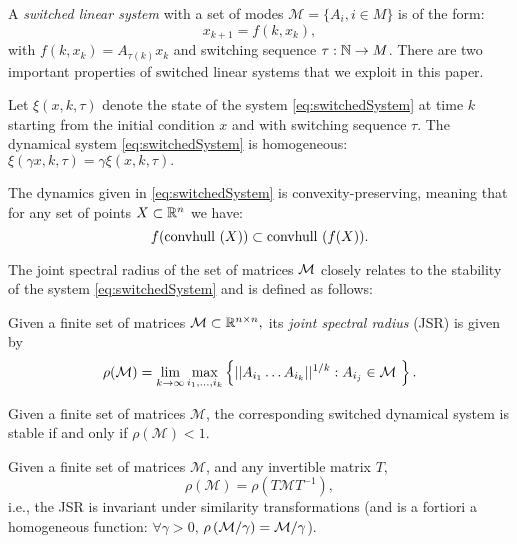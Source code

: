 A \emph{switched linear system} with a set of modes \mbox{$\mathcal{M}= \{A_i, i \in M \}$} is of the form:
\begin{equation}\label{eq:switchedSystem}x_{k+1} = f(k,x_k),\end{equation}
with $f(k,x_k) = A_{\tau(k)}x_k$ and switching sequence \mbox{$\tau: \mathbb{N} \to M$.} There are two important properties of switched linear systems that we exploit in this paper.
\begin{property}\label{property:homogeneity}
Let $\xi(x, k, \tau)$ denote the state of the system \eqref{eq:switchedSystem} at time $k$ starting from the initial condition $x$ and with switching sequence $\tau$. The dynamical system \eqref{eq:switchedSystem} is homogeneous: $\xi(\gamma x, k, \tau)= \gamma \xi(x, k, \tau).$
\end{property}
\begin{property}\label{property:convpres}
The dynamics given in \eqref{eq:switchedSystem} is convexity-preserving, meaning that for any set of points $X \subset \mathbb{R}^n$ we have:
$$ f(\mbox{convhull }({X}))\subset \mbox{convhull }(f(X)). $$
\end{property}

The joint spectral radius of the set of matrices $\mathcal{M}$ closely relates to the stability of the system \eqref{eq:switchedSystem} and is defined as follows:
\begin{definition} \cite{jungers_lncis} Given a finite set of matrices \mbox{$\mathcal{M} \subset \mathbb{R}^{n\times n},$} its \emph{joint spectral radius} (JSR) is given by
$$\rho(\mathcal{M}) =\lim_{k\rightarrow \infty} \max_{i_1,\dots, i_k} \left\{||A_{i_1} \dots A_{i_k}||^{1/k}: A_{i_j}\in\mathcal{M}\ \right\}. $$
\end{definition}

\begin{property}
Given a finite set of matrices $\mathcal{M}$, the corresponding switched dynamical system is stable if and only if $\rho(\mathcal{M})<1$.
\end{property}

\begin{property}\label{rem:scaling}
Given a finite set of matrices $\mathcal{M}$, and any invertible matrix $T$, 
$$\rho(\mathcal{M})=\rho(T \mathcal{M} T^{-1}),$$
i.e., the JSR is invariant under similarity transformations (and is a fortiori a homogeneous function: $\forall \gamma > 0,\,$\linebreak$\rho\left(\mathcal{M}/\gamma\right)=\mathcal{M}/\gamma$).
\end{property}

